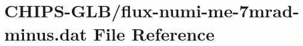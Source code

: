 \hypertarget{flux-numi-me-7mrad-minus_8dat}{}\section{C\+H\+I\+P\+S-\/\+G\+L\+B/flux-\/numi-\/me-\/7mrad-\/minus.dat File Reference}
\label{flux-numi-me-7mrad-minus_8dat}
